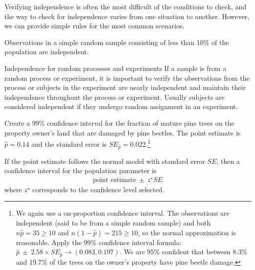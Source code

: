 Verifying independence is often the most difficult of the conditions to check, and the way to check for independence varies from one situation to another. However, we can provide simple rules for the most common scenarios.

\begin{tipBox}{
Observations in a simple random sample consisting of less than 10\% of the population are independent.}
\end{tipBox}

\begin{caution}
{Independence for random processes and experiments}
{If a sample is from a random process or experiment, it is important to verify the observations from the process or subjects in the experiment are nearly independent and maintain their independence throughout the process or experiment. Usually subjects are considered independent if they undergo random assignment in an experiment.}
\end{caution}


\begin{exercise} \label{find99CIForRun10AgeExercise}\label{find99CIForPropOfPineBeetleDamagedTrees}
Create a 99\% confidence interval for the fraction of mature pine trees on the property owner's land that are damaged by pine beetles. The point estimate is $\hat{p} = 0.14$ and the standard error is $SE_{\hat{p}} = 0.022$.\footnote{We again use a on-proportion confidence interval. The observations are independent (said to be from a simple random sample) and both $n\hat{p} = 35 \geq 10$ and $n(1-\hat{p}) = 215 \geq 10$, so the normal approximation is reasonable. Apply the 99\% confidence interval formula: $\hat{p}\ \pm\ 2.58 \times  SE_{\hat{p}} \rightarrow (0.083, 0.197)$. We are 95\% confident that between 8.3\% and 19.7\% of the trees on the owner's property have pine beetle damage.}
\end{exercise}

\begin{termBox}{
If the point estimate follows the normal model with standard error $SE$, then a confidence interval for the population parameter is
\begin{eqnarray*}
\text{point estimate}\ \pm\ z^{\star} SE
\end{eqnarray*}
where $z^{\star}$ corresponds to the confidence level selected.}
\end{termBox}

